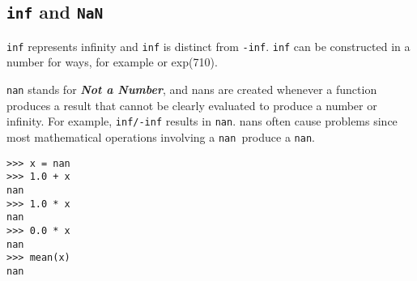 \documentclass[KSmain.tex]{subfiles}
\begin{document}
 
\subsection{ \texttt{inf} and \texttt{NaN}}
\texttt{inf} represents infinity and \texttt{inf} is distinct from \texttt{-inf}.
\texttt{inf} can be constructed in a number for ways, for
example or exp(710). 

\texttt{nan} stands for \textbf{\textit{Not a Number}}, and nans are created whenever a function produces
a result that cannot be clearly evaluated to produce a number or infinity. For example, \texttt{inf/-inf} results in
\texttt{nan}. nans often cause problems since most mathematical operations involving a \texttt{nan }produce a \texttt{nan}.
\begin{framed}
\begin{verbatim}
>>> x = nan
>>> 1.0 + x
nan
>>> 1.0 * x
nan
>>> 0.0 * x
nan
>>> mean(x)
nan
\end{verbatim}
\end{framed}
\end{document}

